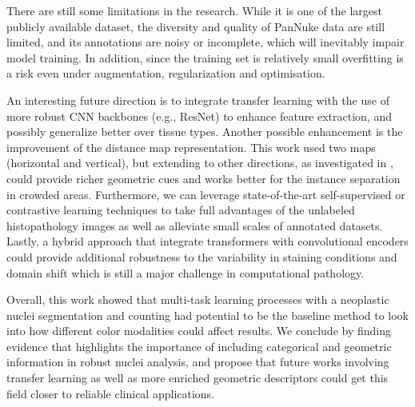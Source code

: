 \documentclass[target=bach,aauheader=,style=]{thud}
\begin{document}
There are still some limitations in the research. While it is one of the largest publicly available dataset, the diversity and quality of PanNuke data are still limited, and its annotations are noisy or incomplete, which will inevitably impair model training. In addition, since the training set is relatively small overfitting is a risk even under augmentation, regularization and optimisation.

An interesting future direction is to integrate transfer learning with the use of more robust CNN backbones (e.g., ResNet) to enhance feature extraction, and possibly generalize better over tissue types. Another possible enhancement is the improvement of the distance map representation. This work used two maps (horizontal and vertical), but extending to other directions, as investigated in \cite{Schmidt_2018}, could provide richer geometric cues and works better for the instance separation in crowded areas. Furthermore, we can leverage state-of-the-art self-supervised or contrastive learning techniques to take full advantages of the unlabeled histopathology images as well as alleviate small scales of annotated datasets. Lastly, a hybrid approach that integrate transformers with convolutional encoders could provide additional robustness to the variability in staining conditions and domain shift which is still a major challenge in computational pathology.

Overall, this work showed that multi-task learning processes with a neoplastic nuclei segmentation and counting had potential to be the baseline method to look into how different color modalities could affect results. We conclude by finding evidence that highlights the importance of including categorical and geometric information in robust nuclei analysis, and propose that future works involving transfer learning as well as more enriched geometric descriptors could get this field closer to reliable clinical applications.


\backmatter
\end{document}
